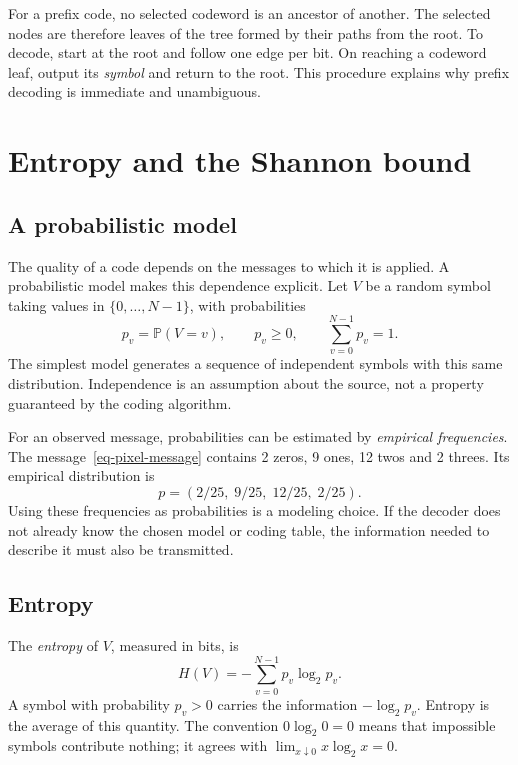 For a prefix code, no selected codeword is an ancestor of another. The selected nodes are therefore leaves of the tree formed by their paths from the root. To decode, start at the root and follow one edge per bit. On reaching a codeword leaf, output its \emph{symbol} and return to the root. This procedure explains why prefix decoding is immediate and unambiguous.

\section{Entropy and the Shannon bound}
\subsection{A probabilistic model}
The quality of a code depends on the messages to which it is applied. A probabilistic model makes this dependence explicit. Let $V$ be a random symbol taking values in $\{0,\ldots,N-1\}$, with probabilities
\[
 p_v=\mathbb{P}(V=v),\qquad p_v\geq0,\qquad \sum_{v=0}^{N-1}p_v=1.
\]
The simplest model generates a sequence of independent symbols with this same distribution. Independence is an assumption about the source, not a property guaranteed by the coding algorithm.

For an observed message, probabilities can be estimated by \emph{empirical frequencies}. The message~\eqref{eq-pixel-message} contains 2 zeros, 9 ones, 12 twos and 2 threes. Its empirical distribution is
\[
 p=(2/25,\;9/25,\;12/25,\;2/25).
\]
Using these frequencies as probabilities is a modeling choice. If the decoder does not already know the chosen model or coding table, the information needed to describe it must also be transmitted.

\subsection{Entropy}
The \emph{entropy} of $V$, measured in bits, is
\begin{equation}\label{eq-entropy}
 H(V)=-\sum_{v=0}^{N-1}p_v\log_2p_v.
\end{equation}
A symbol with probability $p_v>0$ carries the information $-\log_2p_v$. Entropy is the average of this quantity. The convention $0\log_2 0=0$ means that impossible symbols contribute nothing; it agrees with $\lim_{x\downarrow0}x\log_2x=0$.

